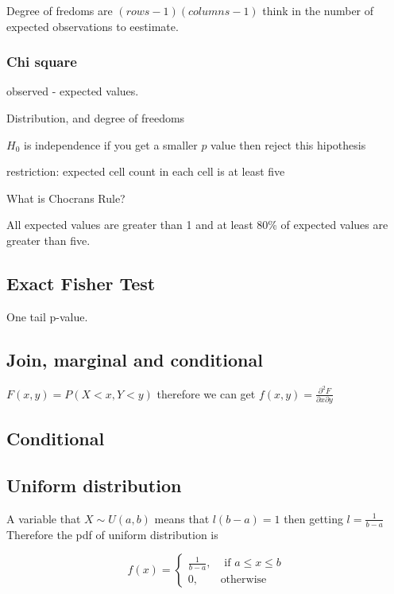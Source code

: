 \documentclass[10pt,a4paper]{article}
\begin{document}
Degree of fredoms are $(rows-1)(columns-1)$
think in the number of expected observations to eestimate.
\subsubsection{Chi square}


observed - expected values.


Distribution, and degree of freedoms 

$H_{0}$ is independence 
if you get a smaller $p$ value then 
reject this hipothesis



restriction:
expected cell count in each cell is at least five


What is Chocrans Rule?

All expected values are greater than 1
and at least 80\% of expected values
are greater than five.



\subsection{Exact Fisher Test}
One tail p-value.









\subsection{Join, marginal and conditional}

$F(x,y)= P(X<x, Y<y)$ therefore we can 
get $ f(x,y) = \frac{\partial^{2}F}{\partial x \partial y}$


\subsection{Conditional}

 

\subsection{Uniform distribution}
A variable that $X \sim U(a,b)$
means that $ l(b-a) = 1 $ then getting 
$l = \frac{1}{b-a}$
Therefore the pdf of uniform distribution is


\begin{equation}
f(x) =\begin{cases}
\frac{1}{b-a}, & \text{ if $a \leq x   \leq b$} \\
0, & \text{otherwise}
\end{cases}
\end{equation}
\end{document}
